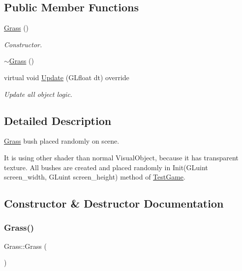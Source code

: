 \subsection*{Public Member Functions}
\begin{DoxyCompactItemize}
\item 
\mbox{\hyperlink{class_grass_a6a01aa19eb0946977e7574f3a4896d02}{Grass}} ()
\begin{DoxyCompactList}\small\item\em Constructor. \end{DoxyCompactList}\item 
\mbox{\hyperlink{class_grass_ac527ea231c26b96ec7ad601e307666f3}{$\sim$\+Grass}} ()
\item 
virtual void \mbox{\hyperlink{class_grass_a131e61f169777625ba4b955fdab9287e}{Update}} (G\+Lfloat dt) override
\begin{DoxyCompactList}\small\item\em Update all object logic. \end{DoxyCompactList}\end{DoxyCompactItemize}


\subsection{Detailed Description}
\mbox{\hyperlink{class_grass}{Grass}} bush placed randomly on scene. 

It is using other shader than normal Visual\+Object, because it has transparent texture. All bushes are created and placed randomly in Init(\+G\+Luint screen\+\_\+width, G\+Luint screen\+\_\+height) method of \mbox{\hyperlink{class_test_game}{Test\+Game}}. 

\subsection{Constructor \& Destructor Documentation}
\mbox{\label{class_grass_a6a01aa19eb0946977e7574f3a4896d02}} 
\subsubsection{\texorpdfstring{Grass()}{Grass()}}
{\footnotesize\ttfamily Grass\+::\+Grass (\begin{DoxyParamCaption}{ }\end{DoxyParamCaption})}



